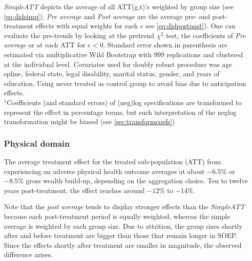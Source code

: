 \begin{table}[htbp!]
\begin{adjustbox}{max width=\textwidth}
\begin{threeparttable}
\begin{tablenotes}
               \textit{SimpleATT} depicts the average of all ATT(g,t)'s weighted by group size (see \cref{eq:didsimp}). 
               \textit{Pre average} and \textit{Post average} are the average pre- and post-treatment effects with equal
               weights for each $e$ see \cref{eq:didpostpast}).
               One can evaluate the pre-trends by looking at the pretrend $\chi^{2}$ test, 
               the coefficients of \textit{Pre average} or at each ATT for $e<0$.
               Standard error shown in parenthesis are estimated via multiplicative Wild Bootstrap with 999
               replications and clustered at the individual level.
               Covariates used for doubly robust procedure was age spline, federal state, legal disability, 
               marital status, gender, and years of education.
               Using never treated as control group to avoid bias due to anticipation effects.\\
               $^1$Coefficients (and standard errors) of (neg)log specifications are transformed to 
               represent the effect in percentage terms, but such interpretation of the neglog
               transformation might be biased (see \cref{sec:transformcoefs})
            \end{tablenotes}
        \end{threeparttable}
    \end{adjustbox}
\end{table}


\subsubsection{Physical domain} %

The average treatment effect for the treated sub-population (ATT) from experiencing an adverse physical health
outcome averages at about $-6.5\%$ or $-8.5\%$ gross wealth build-up, depending on the aggregation
choice. Ten to twelve years post-treatment, the effect reaches around $-12\%$ to $-14\%$.

Note that the \textit{post average} tends to display stronger effects than the \textit{SimpleATT} because each
post-treatment period is equally weighted, whereas the simple average is weighted by each group size. Due to
attrition, the group sizes shortly after and before treatment are bigger than those that remain longer in
SOEP. Since the effects shortly after treatment are smaller in magnitude, the observed difference arises.


